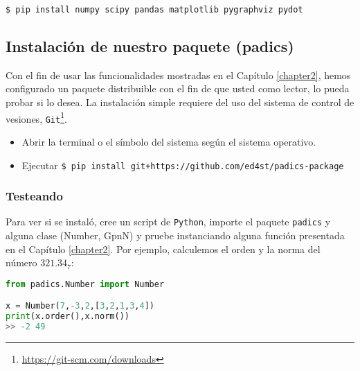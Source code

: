 \texttt{\$ pip install numpy scipy pandas matplotlib pygraphviz pydot}
\subsection*{Instalación de nuestro paquete (padics)}
Con el fin de usar las funcionalidades mostradas en el Capítulo \ref{chapter2}, hemos configurado un paquete distribuible con el fin de que usted como lector, lo pueda probar si lo desea. La instalación simple requiere del uso del sistema de control de vesiones, \texttt{Git}\footnote{\url{https://git-scm.com/downloads}}.

\begin{itemize}
	\item Abrir la terminal o el símbolo del sistema según el sistema operativo.
	\item Ejecutar \texttt{\$ pip install git+https://github.com/ed4st/padics-package}
\end{itemize}
\subsubsection{Testeando}
Para ver si se instaló, cree un script de \texttt{Python}, importe el paquete \texttt{padics} y alguna clase (Number, GpnN) y pruebe instanciando alguna función presentada en el Capítulo \ref{chapter2}. Por ejemplo, calculemos el orden y la norma del número $321.34_7$:
\begin{lstlisting}[language = Python, caption = test del paquete]
from padics.Number import Number

x = Number(7,-3,2,[3,2,1,3,4])
print(x.order(),x.norm())
>> -2 49
\end{lstlisting}
